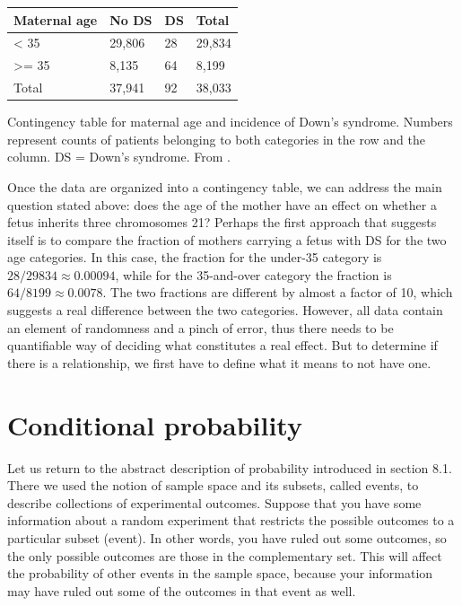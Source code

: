 \documentclass[
]{book}
\theoremstyle{definition}
\theoremstyle{definition}
\theoremstyle{definition}
\theoremstyle{remark}
\begin{document}
\begin{longtable}[]{@{}llll@{}}
\toprule
Maternal age & No DS & DS & Total\tabularnewline
\midrule
\endhead
\textless{} 35 & 29,806 & 28 & 29,834\tabularnewline
\textgreater= 35 & 8,135 & 64 & 8,199\tabularnewline
Total & 37,941 & 92 & 38,033\tabularnewline
\bottomrule
\end{longtable}

Contingency table for maternal age and incidence of Down's syndrome. Numbers represent counts of patients belonging to both categories in the row and the column. DS = Down's syndrome. From \citep{malone_first-trimester_2005}.

Once the data are organized into a contingency table, we can address the main question stated above: does the age of the mother have an effect on whether a fetus inherits three chromosomes 21? Perhaps the first approach that suggests itself is to compare the fraction of mothers carrying a fetus with DS for the two age categories. In this case, the fraction for the under-35 category is \(28/29834 \approx 0.00094\), while for the 35-and-over category the fraction is \(64/8199 \approx 0.0078\). The two fractions are different by almost a factor of 10, which suggests a real difference between the two categories. However, all data contain an element of randomness and a pinch of error, thus there needs to be quantifiable way of deciding what constitutes a real effect. But to determine if there is a relationship, we first have to define what it means to not have one.

\hypertarget{conditional-probability}{%
\section{Conditional probability}\label{conditional-probability}}

\label{sec:math6_1}

Let us return to the abstract description of probability introduced in section 8.1. There we used the notion of sample space and its subsets, called events, to describe collections of experimental outcomes. Suppose that you have some information about a random experiment that restricts the possible outcomes to a particular subset (event). In other words, you have ruled out some outcomes, so the only possible outcomes are those in the complementary set. This will affect the probability of other events in the sample space, because your information may have ruled out some of the outcomes in that event as well.
\end{document}
